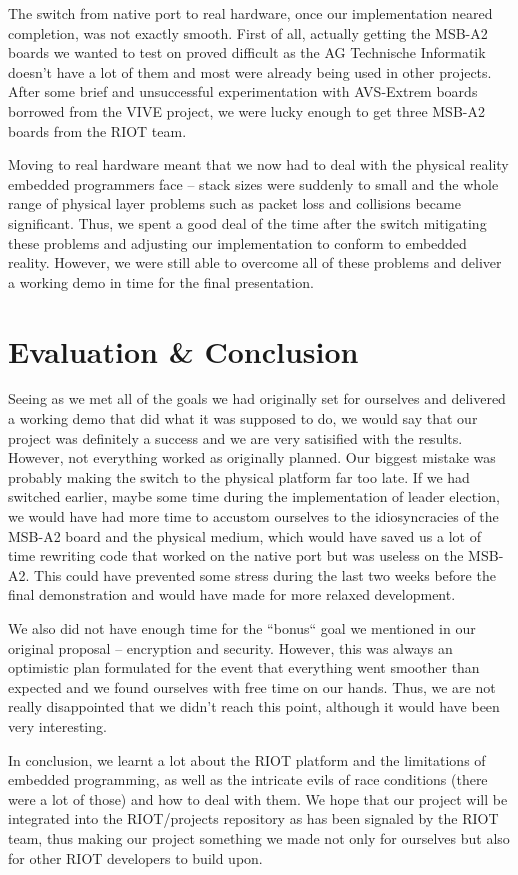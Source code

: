 \documentclass[11pt,
  a4paper,
  ngerman,
  BCOR=7mm
]{scrartcl}
\begin{document}
The switch from native port to real hardware, once our implementation
neared completion, was not exactly smooth. First of all, actually
getting the MSB-A2 boards we wanted to test on proved difficult as the
AG Technische Informatik doesn't have a lot of them and most were
already being used in other projects. After some brief and unsuccessful
experimentation with AVS-Extrem boards borrowed from the VIVE project,
we were lucky enough to get three MSB-A2 boards from the RIOT team.

Moving to real hardware meant that we now had to deal with the physical
reality embedded programmers face -- stack sizes were suddenly to small
and the whole range of physical layer problems such as packet loss and
collisions became significant. Thus, we spent a good deal of the time
after the switch mitigating these problems and adjusting our
implementation to conform to embedded reality. However, we were still
able to overcome all of these problems and deliver a working demo in
time for the final presentation.

\section*{Evaluation \& Conclusion}
\label{sec:evaluation_conclusion}
Seeing as we met all of the goals we had originally set for ourselves
and delivered a working demo that did what it was supposed to do, we
would say that our project was definitely a success and we are very
satisified with the results. However, not everything worked as
originally planned. Our biggest mistake was probably making the switch
to the physical platform far too late. If we had switched earlier, maybe
some time during the implementation of leader election, we would have
had more time to accustom ourselves to the idiosyncracies of the MSB-A2
board and the physical medium, which would have saved us a lot of time
rewriting code that worked on the native port but was useless on the
MSB-A2. This could have prevented some stress during the last two weeks
before the final demonstration and would have made for more relaxed
development.

We also did not have enough time for the ``bonus`` goal we mentioned in
our original proposal -- encryption and security. However, this was
always an optimistic plan formulated for the event that everything went
smoother than expected and we found ourselves with free time on our
hands. Thus, we are not really disappointed that we didn't reach this
point, although it would have been very interesting.

In conclusion, we learnt a lot about the RIOT platform and the
limitations of embedded programming, as well as the intricate evils of
race conditions (there were a lot of those) and how to deal with them.
We hope that our project will be integrated into the RIOT/projects
repository as has been signaled by the RIOT team, thus making our
project something we made not only for ourselves but also for other RIOT
developers to build upon.
\end{document}
